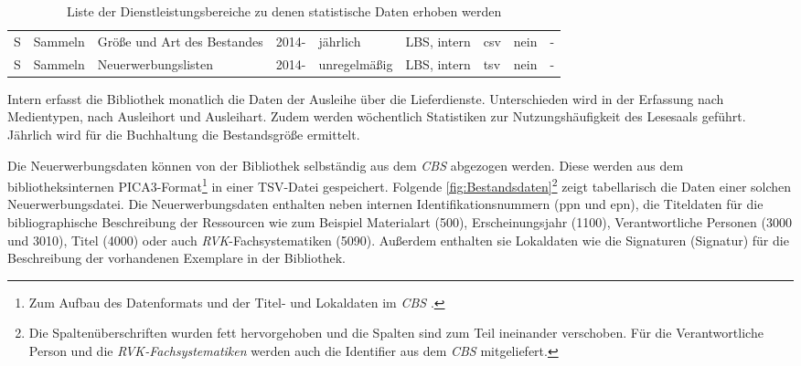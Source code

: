 \begin{table}[H]
\begin{adjustbox}{max width=\textwidth}
\begin{tabular}{p{}p{}p{}p{}p{}p{}p{}p{}p{}}
            S         &Sammeln                       & Größe und Art des Bestandes                   & 2014-             & jährlich          & LBS, intern  & csv                       & nein  & -\\ 
            S         &Sammeln                       & Neuerwerbungslisten                           & 2014-             & unregelmäßig         & LBS, intern  & tsv                       & nein  & -\\ 
            

        \bottomrule
    \end{tabular}
    \end{adjustbox}
    \caption{%
        Liste der Dienstleistungsbereiche zu denen statistische Daten erhoben werden
    \label{tab:Statistische_Daten}
    }
     \end{table}

    
\endgroup


Intern erfasst die Bibliothek monatlich die Daten der Ausleihe über die Lieferdienste. Unterschieden 
wird in der Erfassung nach Medientypen, nach Ausleihort und Ausleihart. Zudem werden wöchentlich 
Statistiken zur Nutzungshäufigkeit des Lesesaals geführt. Jährlich wird für die Buchhaltung die Bestandsgröße ermittelt.

Die Neuerwerbungsdaten können von der Bibliothek selbständig aus dem \textit{\acrshort{CBS}} abgezogen werden. Diese werden aus
dem bibliotheksinternen PICA3-Format\footnote{ Zum Aufbau des Datenformats und der Titel- und Lokaldaten im \textit{\acrlong{CBS}} \cite[vgl.][4]{hebis_datenstruktur_2017}.}
in einer TSV-Datei gespeichert. Folgende \autoref{fig:Bestandsdaten}\footnote{Die Spaltenüberschriften wurden fett hervorgehoben
und die Spalten sind zum Teil ineinander verschoben. Für die Verantwortliche Person und die \textit{\acrshort{RVK}-Fachsystematiken}
werden auch die Identifier aus dem \textit{\acrshort{CBS}} mitgeliefert.} zeigt tabellarisch
die Daten einer solchen Neuerwerbungsdatei.
Die Neuerwerbungsdaten enthalten neben internen Identifikationsnummern (ppn und epn), die Titeldaten für die bibliographische Beschreibung der Ressourcen wie 
zum Beispiel Materialart (500), Erscheinungsjahr (1100), Verantwortliche Personen (3000 und 3010), Titel (4000) oder auch \textit{\acrshort{RVK}}-Fachsystematiken (5090).
Außerdem enthalten sie Lokaldaten wie die Signaturen (Signatur) für die Beschreibung der vorhandenen Exemplare in der Bibliothek.


